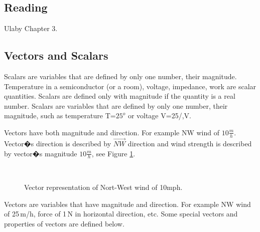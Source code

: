 





\subsection{Reading}
Ulaby Chapter 3. 

\subsection{Vectors and Scalars}
Scalars are variables that are defined by only one number, their magnitude. Temperature in a semiconductor (or a room), voltage, impedance, work are scalar quantities. Scalars are defined only with magnitude if the quantity is a real number. Scalars are variables that are defined by only one number, their magnitude, such as temperature T=$25^o$ or voltage V=25/,V.

Vectors have both magnitude and direction. For example NW wind of $10\frac{m}{h}$. Vector�s direction is described by  $\vec{NW}$ direction and wind strength is described by vector�s magnitude $10\frac{m}{h}$, see Figure \ref{wind}. 



\begin{figure}[htbp]
\begin{center}
\strut{} \\
\end{center}
\caption{Vector representation of Nort-West wind of 10mph.}
\label{wind}
\end{figure}


Vectors are variables that have magnitude and direction. For example NW wind of 25\,m/h, force of 1\,N in horizontal direction, etc. Some special vectors and properties of vectors are defined below.

\newpage

